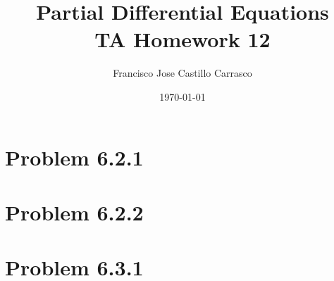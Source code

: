 




\title{Partial Differential Equations\\TA Homework 12}
\author{Francisco Jose Castillo Carrasco}
\date{\today}
\maketitle




\section*{Problem 6.2.1}

\section*{Problem 6.2.2}

\section*{Problem 6.3.1}


